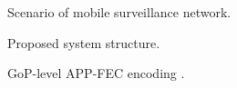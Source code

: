 \documentclass[journal]{IEEEtran}
\begin{document}
\begin{table}[t]
\begin{center}
\begin{tabular}{|p{0.45 in}|p{2.5 in}|}
\hline
\end{tabular}
\end{center}
\label{Table: notations}
\end{table}

\begin{figure}[t]
\vspace{-.06in}
\caption{Scenario of mobile surveillance network.}
\label{fig:scenario}
\end{figure}

\begin{figure}[t]
\caption{Proposed system structure.}
\label{fig:system}
\end{figure}

\begin{figure}[t]
\caption{GoP-level APP-FEC encoding \cite{WSHZ13}.}
\label{fig:GOP_FEC}
\end{figure}
\end{document}

